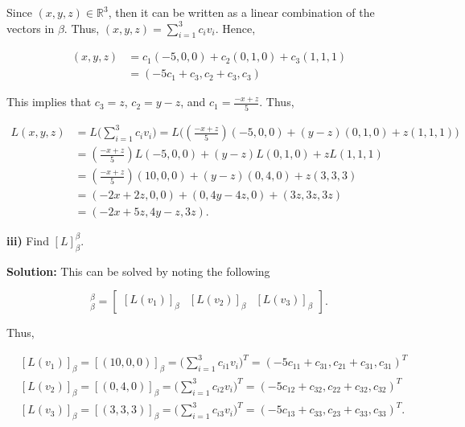 \documentclass[12pt, a4paper]{article}
\begin{document}
 \noindent Since $(x,y,z)\in\mathbb{R}^3$, then it can be written as a linear combination of the vectors in $\beta$. Thus, $(x,y,z)=\sum_{i=1}^3c_iv_i$. Hence,
 
 \begin{equation*}
     \begin{split}
         (x,y,z) &= c_1(-5,0,0)+c_2(0,1,0)+c_3(1,1,1) \\
         &= (-5c_1+c_3, c_2+c_3, c_3)
     \end{split}
 \end{equation*}
 
 \vspace{2mm}
 
 \noindent This implies that $c_3=z$, $c_2=y-z$, and $c_1=\frac{-x+z}{5}$. Thus, 
 
 \begin{equation*}
    \begin{split}
        L(x,y,z) &= L\bigg(\sum\limits_{i=1}^3c_iv_i\bigg)=L\bigg((\frac{-x+z}{5})(-5,0,0)+(y-z)(0,1,0)+z(1,1,1)\bigg) \\ &= (\frac{-x+z}{5})L(-5,0,0)+(y-z)L(0,1,0)+zL(1,1,1) \\
        &= (\frac{-x+z}{5})(10,0,0)+(y-z)(0,4,0)+z(3,3,3) \\
        &= (-2x+2z,0,0)+(0,4y-4z,0)+(3z,3z,3z) \\
        &= (-2x+5z, 4y-z, 3z).
     \end{split}
 \end{equation*}
 
 \vspace{2mm}
 
 \textbf{iii)} Find $[L]_{\beta}^{\beta}$.
 
 \vspace{4mm}
 
 \textbf{Solution:} This can be solved by noting the following
 
 \begin{equation*}
     [L]_{\beta}^{\beta}=\begin{bmatrix} [L(v_1)]_{\beta} & [L(v_2)]_{\beta} & [L(v_3)]_{\beta} \end{bmatrix}.
 \end{equation*}
 
 \vspace{2mm}
 
 \noindent Thus, 
 
 \begin{equation*}
    \begin{split}
        &[L(v_1)]_{\beta}= [(10,0,0)]_{\beta} =\bigg(\sum\limits_{i=1}^3c_{i1}v_i\bigg)^T = (-5c_{11}+c_{31},c_{21}+c_{31},c_{31})^T \\
        &[L(v_2)]_{\beta}=[(0,4,0)]_{\beta}=\bigg(\sum\limits_{i=1}^3c_{i2}v_i\bigg)^T =(-5c_{12}+c_{32},c_{22}+c_{32},c_{32})^T\\
        &[L(v_3)]_{\beta}=[(3,3,3)]_{\beta}=\bigg(\sum\limits_{i=1}^3c_{i3}v_i\bigg)^T =(-5c_{13}+c_{33},c_{23}+c_{33},c_{33})^T.
     \end{split}
 \end{equation*}
 
\end{document}
